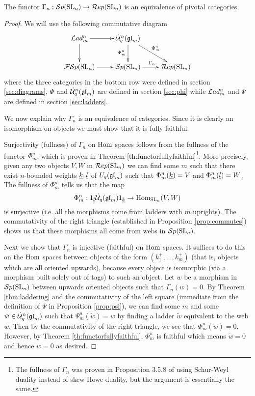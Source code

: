 \documentclass[11pt]{amsart}
\begin{document}
\begin{thm}\label{thm:main}
The functor $\Gamma_n: {\mathcal{S}p}({\rm{SL}}_n) \rightarrow \mathcal{R}ep({\rm{SL}}_n)$ is an equivalence of pivotal categories.
\end{thm}
\begin{proof}
We will use the following commutative diagram
\begin{equation}\label{diag:main}
\xymatrix{
\Lad_m^n \ar[r] \ar[d] & \dU^n(\gl_m) \ar[dr]^{\Phi_m^n} \ar[d]_{\Psi_m^n} & \\
\FSp(\SL_n) \ar[r] & \Sp(\SL_n) \ar[r]^{\Gamma_n} & \Rep(\SL_n) \\
}
\end{equation}
where the three categories in the bottom row were defined in section \ref{sec:diagrams}, $\Phi$ and $\dot{{\mathcal{U}}}_q^n({\mathfrak{gl}}_m)$ are defined in section \ref{sec:phi} while $\mathcal{L}ad_m^n$ and $\Psi$ are defined in section \ref{sec:ladders}.

We now explain why $\Gamma_n$ is an equivalence of categories. Since it is clearly an isomorphism on objects we must show that it is fully faithful.

Surjectivity (fullness) of $\Gamma_n$ on $\operatorname{Hom}$ spaces follows from the fullness of the functor $ \Phi^n_m $, which is proven in Theorem \ref{th:functorfullyfaithful}\footnote{The fullness of $\Gamma_n$ was proven in Proposition 3.5.8 of \cite{0704.1503} using Schur-Weyl duality instead of skew Howe duality, but the argument is essentially the same.}.  More precisely, given any two objects $ V, W $ in $\mathcal{R}ep({\rm{SL}}_n) $ we can find some $m$ such that there exist $ n$-bounded weights $ {\underline{k}}, {\underline{l}} $ of $ U_q({\mathfrak{gl}}_m)$ such that $\Phi^n_m({\underline{k}}) = V$ and $\Phi^n_m({\underline{l}}) = W $. The fullness of $ \Phi^n_m $ tells us that the map
$$ \Phi^n_m : 1_{{\underline{l}}} \dot{{\mathcal{U}}}_q({\mathfrak{gl}}_m) 1_{{\underline{k}}} \rightarrow \operatorname{Hom}_{{\rm{SL}}_n}(V, W) $$
is surjective (i.e. all the morphisms come from ladders with $m$ uprights). The commutativity of the right triangle (established in Proposition \ref{prop:commutes}) shows us that these morphisms all come from webs in $ {\mathcal{S}p}({\rm{SL}}_n) $.

Next we show that $ \Gamma_n $ is injective (faithful) on $ \operatorname{Hom}$ spaces. It suffices to do this on the $\operatorname{Hom}$ spaces between objects of the form $(k_1^+,\ldots,k_m^+)$ (that is, objects which are all oriented upwards), because every object is isomorphic (via a morphism built solely out of tags) to such an object.
Let $w$ be a morphism in $ {\mathcal{S}p}({\rm{SL}}_n)$ between upwards oriented objects such that $\Gamma_n(w)=0$.  By Theorem \ref{thm:laddering} and the commutativity of the left square (immediate from the definition of $\Psi$ in Proposition \ref{prop:psi}), we can find some $ m $ and some $\tilde{w} \in \dot{{\mathcal{U}}}_q^n({\mathfrak{gl}}_m) $ such that $ \Psi^n_m(\tilde{w}) = w $ by finding a ladder $ \tilde{w} $ equivalent to the web $ w $. Then by the commutativity of the right triangle, we see that $ \Phi^n_m(\tilde{w}) = 0 $.  However, by Theorem \ref{th:functorfullyfaithful}, $\Phi_m^n$ is faithful which means $\tilde{w}=0$ and hence $w=0$ as desired.
\end{proof}
\end{document}
